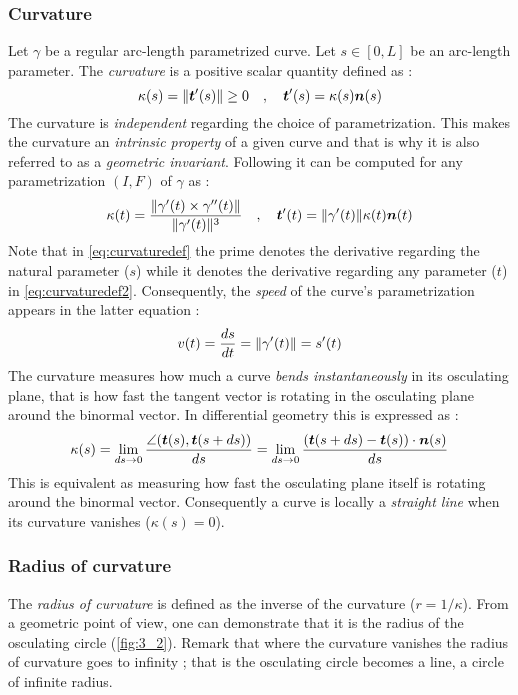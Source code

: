 \subsubsection{Curvature}
Let $\gamma$ be a regular arc-length parametrized curve. Let $s \in [0,L]$ be an arc-length parameter. The \emph{curvature} is a positive scalar quantity defined as :
\begin{equation}
	\kappa(s) = \lVert\boldsymbol{t}'(s)\rVert \ge 0 
	\quad,\quad
	\boldsymbol{t}'(s) = \kappa(s) \boldsymbol{n}(s)
\label{eq:curvaturedef}
\end{equation}
The curvature is \emph{independent} regarding the choice of parametrization. This makes the curvature an \emph{intrinsic property} of a given curve and that is why it is also referred to as a \emph{geometric invariant}. Following \cite[pp.203-204]{Gray2006} it can be computed for any parametrization $(I,F)$ of $\gamma$ as :
\begin{equation}
	\kappa(t) = \frac{\lVert\gamma'(t) \times \gamma''(t)\rVert}{\lVert\gamma'(t)\rVert^3}
	\quad,\quad
	\boldsymbol{t}'(t) = \lVert\gamma'(t)\rVert \kappa(t) \boldsymbol{n}(t)
\label{eq:curvaturedef2}
\end{equation}
Note that in \cref{eq:curvaturedef} the prime denotes the derivative regarding the natural parameter ($s$) while it denotes the derivative regarding any parameter ($t$) in \cref{eq:curvaturedef2}. Consequently, the \emph{speed} of the curve's parametrization appears in the latter equation :
\begin{equation}
	v(t) = \frac{ds}{dt} = \lVert\gamma'(t)\rVert = s'(t)
\end{equation}
The curvature measures how much a curve \emph{bends instantaneously} in its osculating plane, that is how fast the tangent vector is rotating in the osculating plane around the binormal vector. In differential geometry this is expressed as :
\begin{equation}
	\kappa(s)
	= \lim_{ds \to 0}\frac{\angle(\boldsymbol{t}(s),\boldsymbol{t}(s+ds))}{ds}
	= \lim_{ds \to 0}\frac{(\boldsymbol{t}(s+ds) - \boldsymbol{t}(s)) \cdot \boldsymbol{n}(s)}{ds}
\end{equation}
This is equivalent as measuring how fast the osculating plane itself is rotating around the binormal vector. Consequently a curve is locally a \emph{straight line} when its curvature vanishes ($\kappa(s)= 0$).

\subsubsection{Radius of curvature}
The \emph{radius of curvature} is defined as the inverse of the curvature ($r= 1/\kappa$). From a geometric point of view, one can demonstrate that it is the radius of the osculating circle (\cref{fig:3_2}). Remark that where the curvature vanishes the radius of curvature goes to infinity ; that is the osculating circle becomes a line, a circle of infinite radius.

